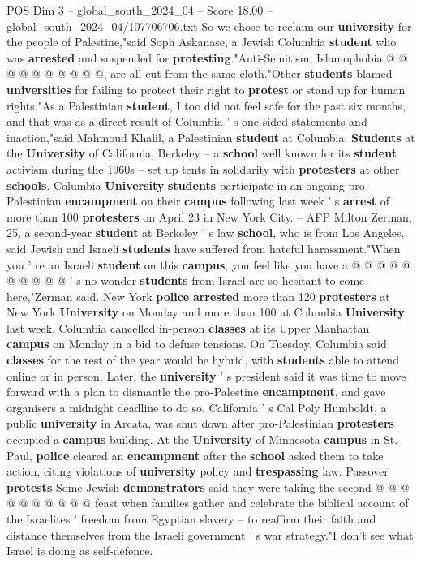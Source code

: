 \begin{textsample}{POS Dim 3 – global\_south\_2024\_04 – Score 18.00 – global\_south\_2024\_04/107706706.txt}
So we chose to reclaim our \textbf{university} for the people of Palestine,"said Soph Askanase, a Jewish Columbia \textbf{student} who was \textbf{arrested} and suspended for \textbf{protesting}."Anti-Semitism, Islamophobia @ @ @ @ @ @ @ @ @ @, are all cut from the same cloth."Other \textbf{students} blamed \textbf{universities} for failing to protect their right to \textbf{protest} or stand up for human rights."As a Palestinian \textbf{student}, I too did not feel safe for the past six months, and that was as a direct result of Columbia ' s one-sided statements and inaction,"said Mahmoud Khalil, a Palestinian \textbf{student} at Columbia. \textbf{Students} at the \textbf{University} of California, Berkeley -- a \textbf{school} well known for its \textbf{student} activism during the 1960s -- set up tents in solidarity with \textbf{protesters} at other \textbf{schools}.
Columbia \textbf{University} \textbf{students} participate in an ongoing pro-Palestinian \textbf{encampment} on their \textbf{campus} following last week ' s \textbf{arrest} of more than 100 \textbf{protesters} on April 23 in New York City. -- AFP Milton Zerman, 25, a second-year \textbf{student} at Berkeley ' s law \textbf{school}, who is from Los Angeles, said Jewish and Israeli \textbf{students} have suffered from hateful harassment."When you ' re an Israeli \textbf{student} on this \textbf{campus}, you feel like you have a @ @ @ @ @ @ @ @ @ @ ' s no wonder \textbf{students} from Israel are so hesitant to come here,"Zerman said.
New York \textbf{police} \textbf{arrested} more than 120 \textbf{protesters} at New York \textbf{University} on Monday and more than 100 at Columbia \textbf{University} last week.
Columbia cancelled in-person \textbf{classes} at its Upper Manhattan \textbf{campus} on Monday in a bid to defuse tensions.
On Tuesday, Columbia said \textbf{classes} for the rest of the year would be hybrid, with \textbf{students} able to attend online or in person.
Later, the \textbf{university} ' s president said it was time to move forward with a plan to dismantle the pro-Palestine \textbf{encampment}, and gave organisers a midnight deadline to do so.
California ' s Cal Poly Humboldt, a public \textbf{university} in Arcata, was shut down after pro-Palestinian \textbf{protesters} occupied a \textbf{campus} building.
At the \textbf{University} of Minnesota \textbf{campus} in St.
Paul, \textbf{police} cleared an \textbf{encampment} after the \textbf{school} asked them to take action, citing violations of \textbf{university} policy and \textbf{trespassing} law.
Passover \textbf{protests} Some Jewish \textbf{demonstrators} said they were taking the second @ @ @ @ @ @ @ @ @ @ feast when families gather and celebrate the biblical account of the Israelites ' freedom from Egyptian slavery -- to reaffirm their faith and distance themselves from the Israeli government ' s war strategy."I don't see what Israel is doing as self-defence.

\end{textsample}
